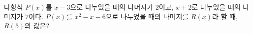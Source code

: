 다항식 $P(x)$를 $x-3$으로 나누었을 때의 나머지가 $2$이고, $x+2$로 나누었을 때의 나머지가 $7$이다. $P(x)$를 $x^2-x-6$으로 나누었을 때의 나머지를 $R(x)$라 할 때, $R(5)$의 값은?
